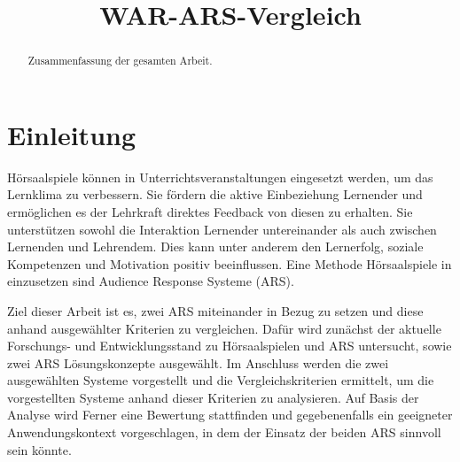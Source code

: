 \documentclass[conference]{IEEEtran}
\begin{document}
\title{WAR-ARS-Vergleich}

\author{
}

\maketitle

\begin{abstract}
Zusammenfassung der gesamten Arbeit.
\end{abstract}


\section{Einleitung}
Hörsaalspiele können in Unterrichtsveranstaltungen eingesetzt werden, um das Lernklima zu verbessern. Sie fördern die aktive Einbeziehung Lernender und ermöglichen es der Lehrkraft direktes Feedback von diesen zu erhalten. Sie unterstützen sowohl die Interaktion Lernender untereinander als auch zwischen Lernenden und Lehrendem. Dies kann unter anderem den Lernerfolg, soziale Kompetenzen und Motivation positiv beeinflussen. \cite[p. 368]{Lehmann2014} Eine Methode Hörsaalspiele in einzusetzen sind Audience Response Systeme (ARS). 

Ziel dieser Arbeit ist es, zwei ARS miteinander in Bezug zu setzen und diese anhand ausgewählter Kriterien zu vergleichen. Dafür wird zunächst der aktuelle Forschungs- und Entwicklungsstand zu Hörsaalspielen und ARS untersucht, sowie zwei ARS Lösungskonzepte ausgewählt. Im Anschluss werden die zwei ausgewählten Systeme vorgestellt und die Vergleichskriterien ermittelt, um die vorgestellten Systeme anhand dieser Kriterien zu analysieren. 
Auf Basis der Analyse wird Ferner eine Bewertung stattfinden und gegebenenfalls ein geeigneter Anwendungskontext vorgeschlagen, in dem der Einsatz der beiden ARS sinnvoll sein könnte.
\end{document}
